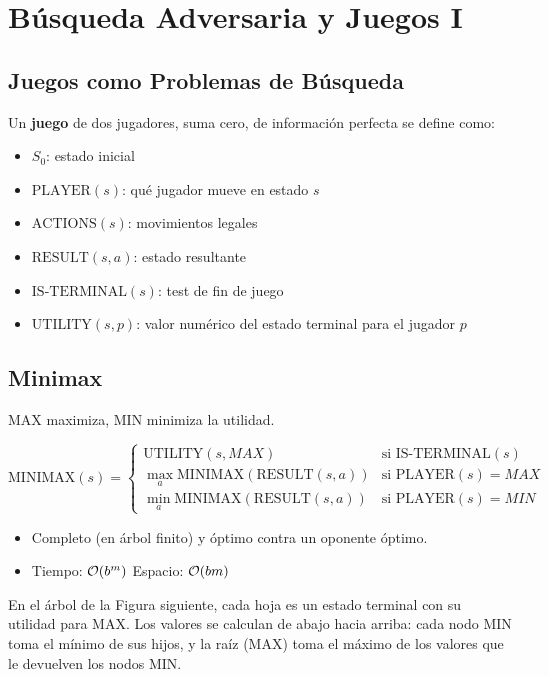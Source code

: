\section{Búsqueda Adversaria y Juegos I}

\subsection{Juegos como Problemas de Búsqueda}

Un \textbf{juego} de dos jugadores, suma cero, de información perfecta se define como:
\begin{itemize}
    \item $S_0$: estado inicial
    \item $\text{PLAYER}(s)$: qué jugador mueve en estado $s$
    \item $\text{ACTIONS}(s)$: movimientos legales
    \item $\text{RESULT}(s, a)$: estado resultante
    \item $\text{IS-TERMINAL}(s)$: test de fin de juego
    \item $\text{UTILITY}(s, p)$: valor numérico del estado terminal para el jugador $p$
\end{itemize}

\subsection{Minimax}

MAX maximiza, MIN minimiza la utilidad.

$$\text{MINIMAX}(s) = \begin{cases}
\text{UTILITY}(s, MAX) & \text{si IS-TERMINAL}(s) \\
\max_{a} \text{MINIMAX}(\text{RESULT}(s,a)) & \text{si PLAYER}(s) = MAX \\
\min_{a} \text{MINIMAX}(\text{RESULT}(s,a)) & \text{si PLAYER}(s) = MIN
\end{cases}$$

\begin{itemize}
    \item Completo (en árbol finito) y óptimo contra un oponente óptimo.
    \item Tiempo: $\mathcal{O}(b^m)$ \quad Espacio: $\mathcal{O}(bm)$
\end{itemize}

\begin{example}
    En el árbol de la Figura siguiente, cada hoja es un estado terminal con su utilidad para MAX. Los valores se
    calculan de abajo hacia arriba: cada nodo MIN toma el mínimo de sus hijos, y la raíz (MAX) toma el máximo de los
    valores que le devuelven los nodos MIN.
\end{example}

